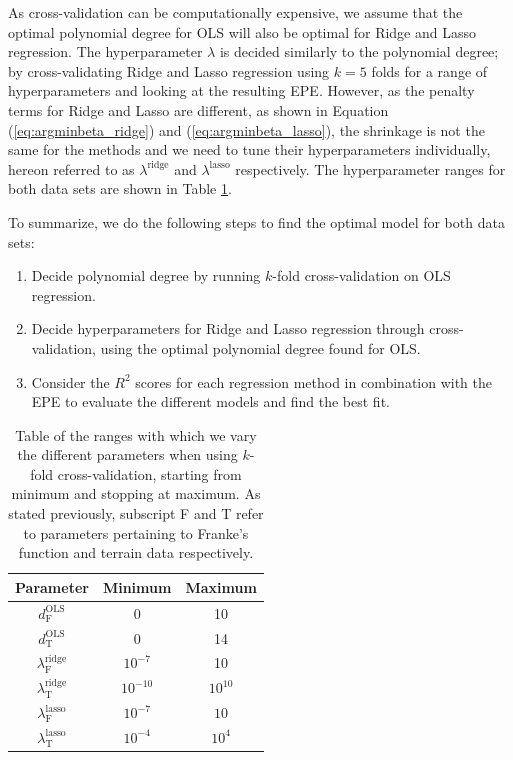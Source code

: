 \documentclass[a4paper, 10pt]{article}
\begin{document}
\begin{multicols}{2}
As cross-validation can be computationally expensive, we assume that the optimal polynomial degree for OLS will also be optimal for Ridge and Lasso regression. The hyperparameter $\lambda$ is decided similarly to the polynomial degree; by cross-validating  Ridge and Lasso regression using $k=5$ folds for a range of hyperparameters and looking at the resulting EPE. However, as the penalty terms for Ridge and Lasso are different, as shown in Equation (\ref{eq:argminbeta_ridge}) and (\ref{eq:argminbeta_lasso}), the shrinkage is not the same for the methods and we need to tune their hyperparameters individually, hereon referred to as $\lambda^\text{ridge}$ and $\lambda^\text{lasso}$ respectively. The hyperparameter ranges for both data sets  are shown in Table \ref{tab:parameters_kfold}.  

To summarize, we do the following steps to find the optimal model for both data sets:
\begin{enumerate}
\item Decide polynomial degree by running $k$-fold cross-validation on OLS regression.
\item Decide hyperparameters for Ridge and Lasso regression through cross-validation, using the optimal polynomial degree found for OLS.
\item Consider the $R^2$ scores for each regression method in combination with the EPE to evaluate the different models and find the best fit. 
\end{enumerate}

\begin{table}[H]
\caption{Table of the ranges with which we vary the different parameters when using $k$-fold cross-validation, starting from minimum and stopping at maximum. As stated previously, subscript F and T refer  to parameters pertaining to Franke's function and terrain data respectively.}
\label{tab:parameters_kfold}
\centering
{\setlength{\extrarowheight}{4pt}
\begin{tabular}{| c | c | c |} \hline
Parameter & Minimum & Maximum  \\ \hline
$d_\text{F}^\text{OLS}$ & 0 & 10 \\ \hline 
$d_\text{T}^\text{OLS}$ & 0 & 14 \\ \hline 
$\lambda^\text{ridge}_\text{F}$  & $10^{-7}$ & 10\\ \hline 
$\lambda^\text{ridge}_\text{T}$ & $10^{-10}$ & $10^{10}$\\ \hline 
$\lambda^\text{lasso}_\text{F}$  & $10^{-7}$ & $10$\\ \hline 
$\lambda^\text{lasso}_\text{T}$ & $10^{-4}$ & $10^{4}$\\ \hline 
\end{tabular}}
\end{table}






\end{multicols}
\end{document}
